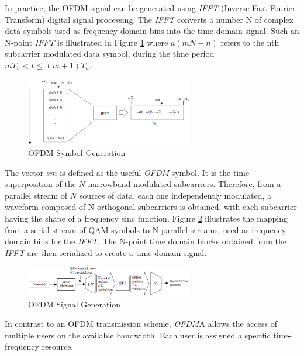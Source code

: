 In practice, the OFDM signal can be generated using \textit{IFFT} (Inverse Fast Fourier
Transform) digital signal processing. The \textit{IFFT} converts a number N of complex
data symbols used as frequency domain bins into the time domain signal. Such an
N-point \textit{IFFT} is illustrated in Figure \ref{fig:ofdmsymbol} where $a(mN+n)$
refers to the nth subcarrier modulated data symbol, during the time period $mT_u <
t \le (m+1)T_u$.

\begin{figure}[htbp]
    \centering
    \includegraphics[width=0.65\textwidth]{./figures/ofdm_symbol_gen}
    \caption{ OFDM Symbol Generation
    \label{fig:ofdmsymbol}}
\end{figure}

The vector $sm$ is defined as the useful \textit{OFDM} symbol. It is the time
superposition of the $N$ narrowband modulated subcarriers. Therefore, from a
parallel stream of $N$ sources of data, each one independently modulated, a
waveform composed of N orthogonal subcarriers is obtained, with each subcarrier
having the shape of a frequency sinc function. Figure \ref{fig:ofdmchain}
illustrates the mapping from a serial stream of QAM symbols to N parallel
streams, used as frequency domain bins for the \textit{IFFT}. The N-point time domain
blocks obtained from the \textit{IFFT} are then serialized to create a time domain
signal.

\begin{figure}[htbp]
    \centering
    \includegraphics[width=0.65\textwidth]{./figures/ofdm_signal_chain}
    \caption{ OFDM Signal Generation
    \label{fig:ofdmchain}}
\end{figure}

In contrast to an OFDM transmission scheme, \textit{OFDM}A allows the access of multiple
users on the available bandwidth. Each user is assigned a specific time-frequency
resource.

